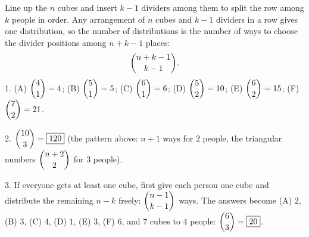 Line up the $n$ cubes and insert $k-1$ dividers among them to split the row among $k$ people in order. Any arrangement of $n$ cubes and $k-1$ dividers in a row gives one distribution, so the number of distributions is the number of ways to choose the divider positions among $n+k-1$ places:
\[
\dbinom{n+k-1}{k-1}.
\]
1. (A) $\dbinom41=4$; (B) $\dbinom51=5$; (C) $\dbinom61=6$; (D) $\dbinom52=10$; (E) $\dbinom62=15$; (F) $\dbinom72=21$.

2. $\dbinom{10}{3}=\boxed{120}$ (the pattern above: $n+1$ ways for $2$ people, the triangular numbers $\dbinom{n+2}{2}$ for $3$ people).

3. If everyone gets at least one cube, first give each person one cube and distribute the remaining $n-k$ freely: $\dbinom{n-1}{k-1}$ ways. The answers become (A) $2$, (B) $3$, (C) $4$, (D) $1$, (E) $3$, (F) $6$, and $7$ cubes to $4$ people: $\dbinom63=\boxed{20}$.
